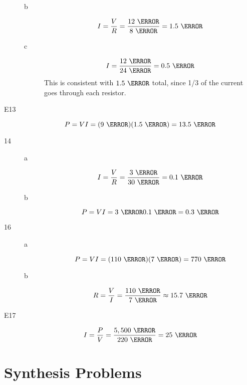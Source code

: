 \documentclass{exam}
\begin{document}
\begin{description}
\begin{description}
\item[b]
\[
  I = \frac{V}{R} = \frac{12 \ \volt}{8 \ \ohm} = 1.5 \ \ampere
\]

\item[c]
\[
  I = \frac{12 \ \volt}{24 \ \ohm} = 0.5 \ \ampere
\]
This is consistent with $1.5 \ \ampere$ total, since 1/3 of the current goes through each resistor.

\end{description}

\item[E13]
\[
  P = VI = (9 \ \volt)(1.5 \ \ampere) = 13.5 \ \watt
\]

\item[14]
\begin{description}

\item[a]
\[
  I = \frac{V}{R} = \frac{3 \ \volt}{30 \ \ohm} = 0.1 \ \ampere
\]

\item[b]
\[
  P = VI = {3 \ \volt}{0.1 \ \ampere} = 0.3 \ \watt
\]

\end{description}

\item[16]

\begin{description}

\item[a]
\[
  P = VI = (110 \ \volt)(7 \ \ampere) = 770 \ \watt
\]

\item[b]
\[
  R = \frac{V}{I} = \frac{110 \ \volt}{7 \ \ampere} \approx 15.7 \ \ohm
\]

\end{description}

\item[E17]
\[
  I = \frac{P}{V} = \frac{5,500 \ \watt}{220 \ \volt} = 25 \ \ampere
\]
\end{description}

\section{Synthesis Problems}
\end{document}
